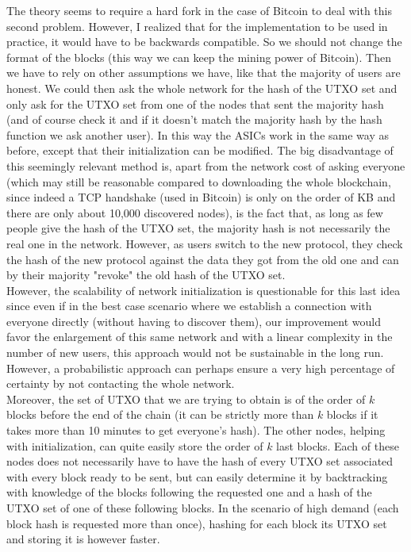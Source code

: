 \documentclass[12pt,a4paper]{article}
\begin{document}
	The theory seems to require a hard fork in the case of Bitcoin to deal with this second problem. However, I realized that for the implementation to be used in practice, it would have to be backwards compatible. So we should not change the format of the blocks (this way we can keep the mining power of Bitcoin). Then we have to rely on other assumptions we have, like that the majority of users are honest. We could then ask the whole network for the hash of the UTXO set and only ask for the UTXO set from one of the nodes that sent the majority hash (and of course check it and if it doesn't match the majority hash by the hash function we ask another user). In this way the ASICs work in the same way as before, except that their initialization can be modified. The big disadvantage of this seemingly relevant method is, apart from the network cost of asking everyone (which may still be reasonable compared to downloading the whole blockchain, since indeed a TCP handshake (used in Bitcoin) is only on the order of KB and there are only about 10,000 discovered nodes), is the fact that, as long as few people give the hash of the UTXO set, the majority hash is not necessarily the real one in the network. However, as users switch to the new protocol, they check the hash of the new protocol against the data they got from the old one and can by their majority "revoke" the old hash of the UTXO set.\\
	However, the scalability of network initialization is questionable for this last idea since even if in the best case scenario where we establish a connection with everyone directly (without having to discover them), our improvement would favor the enlargement of this same network and with a linear complexity in the number of new users, this approach would not be sustainable in the long run. However, a probabilistic approach can perhaps ensure a very high percentage of certainty by not contacting the whole network.\\
Moreover, the set of UTXO that we are trying to obtain is of the order of $k$ blocks before the end of the chain (it can be strictly more than $k$ blocks if it takes more than 10 minutes to get everyone's hash). The other nodes, helping with initialization, can quite easily store the order of $k$ last blocks. Each of these nodes does not necessarily have to have the hash of every UTXO set associated with every block ready to be sent, but can easily determine it by backtracking with knowledge of the blocks following the requested one and a hash of the UTXO set of one of these following blocks. In the scenario of high demand (each block hash is requested more than once), hashing for each block its UTXO set and storing it is however faster.\\
\end{document}
